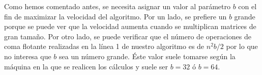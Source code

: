 \documentclass[a4paper,12pt]{article}
\newenvironment{exercise}[1]%
{%
  \par\vspace{\baselineskip}\noindent
  \textbf{Ejercicio (#1)}\begin{itshape}%
  \par\vspace{\baselineskip}\noindent\ignorespaces
}%
{%
  \end{itshape}\ignorespacesafterend
}
\begin{document}
\bigskip

Como hemos comentado antes, se necesita asignar un valor al par\'ametro $b$ con el fin de maximizar la velocidad del algoritmo. Por un lado, se prefiere un $b$ grande porque se puede ver que la velocidad aumenta cuando se multiplican matrices de gran tama\~no. Por otro lado, se puede verificar que el n\'umero de operaciones de coma flotante realizadas en la l\'inea 1 de nuestro algoritmo es de $n^2 b/2$ por lo que no interesa que $b$ sea un n\'umero grande. \'Este valor suele tomarse seg\'un la m\'aquina en la que se realicen los c\'alculos y suele ser $b=32$ \'o $b=64$.

	  

%
%
%
%
%
%
%
%
%
%
%
%
%
\end{document}
